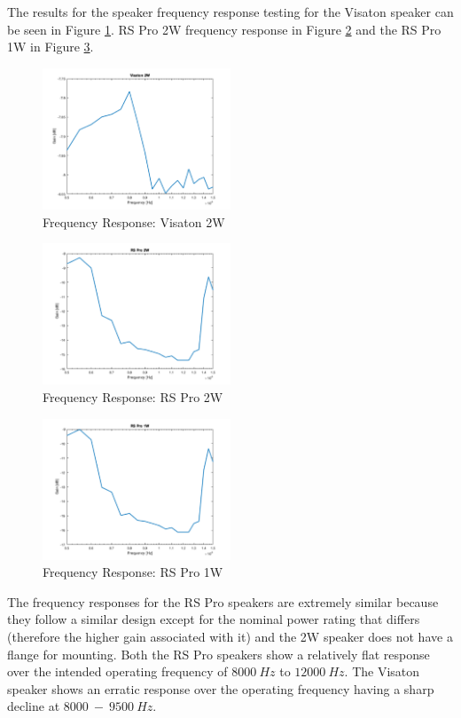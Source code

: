 The results for the speaker frequency response testing for the Visaton speaker can be seen in Figure \ref{fig:Visaton2W}. RS Pro 2W frequency response in Figure \ref{fig:RSPro2W} and the RS Pro 1W in Figure \ref{fig:RSPro1W}.
\begin{figure}[h!]
    \centering
    \includegraphics[width = 0.5\textwidth]{images/Visaton2W.pdf}
    \caption{Frequency Response: Visaton 2W}\label{fig:Visaton2W}
\end{figure}
\begin{figure}[h!]
    \centering
    \includegraphics[width = 0.5\textwidth]{images/RSPro2W.pdf}
    \caption{Frequency Response: RS Pro 2W}\label{fig:RSPro2W}
\end{figure}
\begin{figure}[h!]
    \centering
    \includegraphics[width = 0.5\textwidth]{images/RSPro1W.pdf}
    \caption{Frequency Response: RS Pro 1W}\label{fig:RSPro1W}
\end{figure}
The frequency responses for the RS Pro speakers are extremely similar because they follow a similar design except for the nominal power rating that differs (therefore the higher gain associated with it) and the 2W speaker does not have a flange for mounting. Both the RS Pro speakers show a relatively flat response over the intended operating frequency of $8000\ Hz$ to $12000\ Hz$. The Visaton speaker shows an erratic response over the operating frequency having a sharp decline at $8000\ -\ 9500\ Hz$.

